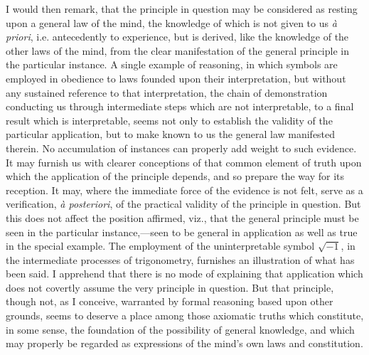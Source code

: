 \documentclass[oneside]{book}
\begin{document}
I would then remark, that the principle in question may be
considered as resting upon a general law of the mind, the knowledge
of which is not given to us \textit{\`{a} priori}, i.e. antecedently to
experience, but is derived, like the knowledge of the other laws
of the mind, from the clear manifestation of the general principle
in the particular instance. A single example of reasoning, in
which symbols are employed in obedience to laws founded upon
their interpretation, but without any sustained reference to that
interpretation, the chain of demonstration conducting us through
intermediate steps which are not interpretable, to a final result
which is interpretable, seems not only to establish the validity of
the particular application, but to make known to us the general
law manifested therein. No accumulation of instances can properly
add weight to such evidence. It may furnish us with clearer
conceptions of that common element of truth upon which the application
of the principle depends, and so prepare the way for its
reception. It may, where the immediate force of the evidence is
not felt, serve as a verification, \textit{\`{a} posteriori}, of the practical validity
of the principle in question. But this does not affect the position
affirmed, viz., that the general principle must be seen in the
particular instance,---seen to be general in application as well as
true in the special example. The employment of the uninterpretable
symbol $\sqrt{-1}$, in the intermediate processes of trigonometry,
furnishes an illustration of what has been said. I apprehend that
there is no mode of explaining that application which does not
covertly assume the very principle in question. But that principle,
though not, as I conceive, warranted by formal reasoning
based upon other grounds, seems to deserve a place among those
axiomatic truths which constitute, in some sense, the foundation
of the possibility of general knowledge, and which may properly
be regarded as expressions of the mind's own laws and constitution.
\end{document}
